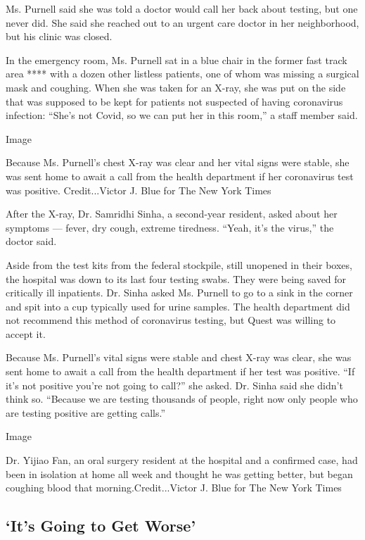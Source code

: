 Ms. Purnell said she was told a doctor would call her back about
testing, but one never did. She said she reached out to an urgent care
doctor in her neighborhood, but his clinic was closed.

In the emergency room, Ms. Purnell sat in a blue chair in the former
fast track area **** with a dozen other listless patients, one of whom
was missing a surgical mask and coughing. When she was taken for an
X-ray, she was put on the side that was supposed to be kept for patients
not suspected of having coronavirus infection: ``She's not Covid, so we
can put her in this room,'' a staff member said.

Image

Because Ms. Purnell's chest X-ray was clear and her vital signs were
stable, she was sent home to await a call from the health department if
her coronavirus test was positive. Credit...Victor J. Blue for The New
York Times

After the X-ray, Dr. Samridhi Sinha, a second-year resident, asked about
her symptoms --- fever, dry cough, extreme tiredness. ``Yeah, it's the
virus,'' the doctor said.

Aside from the test kits from the federal stockpile, still unopened in
their boxes, the hospital was down to its last four testing swabs. They
were being saved for critically ill inpatients. Dr. Sinha asked Ms.
Purnell to go to a sink in the corner and spit into a cup typically used
for urine samples. The health department did not recommend this method
of coronavirus testing, but Quest was willing to accept it.

Because Ms. Purnell's vital signs were stable and chest X-ray was clear,
she was sent home to await a call from the health department if her test
was positive. ``If it's not positive you're not going to call?'' she
asked. Dr. Sinha said she didn't think so. ``Because we are testing
thousands of people, right now only people who are testing positive are
getting calls.''

Image

Dr. Yijiao Fan, an oral surgery resident at the hospital and a confirmed
case, had been in isolation at home all week and thought he was getting
better, but began coughing blood that morning.Credit...Victor J. Blue
for The New York Times

\hypertarget{its-going-to-get-worse}{%
\subsection{`It's Going to Get Worse'}\label{its-going-to-get-worse}}


